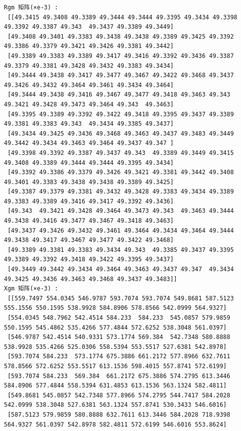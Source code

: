 \documentclass[11pt]{article}
\begin{document}
    \begin{Verbatim}[commandchars=\\\{\}]
Rgm 矩阵(×e-3) : 
 [[49.3415 49.3408 49.3389 49.3444 49.3444 49.3395 49.3434 49.3398 49.3392 49.3387 49.343  49.3437 49.3389 49.3449]
 [49.3408 49.3401 49.3383 49.3438 49.3438 49.3389 49.3425 49.3392 49.3386 49.3379 49.3421 49.3426 49.3381 49.3442]
 [49.3389 49.3383 49.3389 49.3417 49.3416 49.3392 49.3436 49.3387 49.3379 49.3381 49.3428 49.3432 49.3383 49.3434]
 [49.3444 49.3438 49.3417 49.3477 49.3467 49.3422 49.3468 49.3437 49.3426 49.3432 49.3464 49.3461 49.3434 49.3464]
 [49.3444 49.3438 49.3416 49.3467 49.3477 49.3418 49.3463 49.343  49.3421 49.3428 49.3473 49.3464 49.343  49.3463]
 [49.3395 49.3389 49.3392 49.3422 49.3418 49.3395 49.3437 49.3389 49.3381 49.3383 49.343  49.3434 49.3385 49.3437]
 [49.3434 49.3425 49.3436 49.3468 49.3463 49.3437 49.3483 49.3449 49.3442 49.3434 49.3463 49.3464 49.3437 49.347 ]
 [49.3398 49.3392 49.3387 49.3437 49.343  49.3389 49.3449 49.3415 49.3408 49.3389 49.3444 49.3444 49.3395 49.3434]
 [49.3392 49.3386 49.3379 49.3426 49.3421 49.3381 49.3442 49.3408 49.3401 49.3383 49.3438 49.3438 49.3389 49.3425]
 [49.3387 49.3379 49.3381 49.3432 49.3428 49.3383 49.3434 49.3389 49.3383 49.3389 49.3416 49.3417 49.3392 49.3436]
 [49.343  49.3421 49.3428 49.3464 49.3473 49.343  49.3463 49.3444 49.3438 49.3416 49.3477 49.3467 49.3418 49.3463]
 [49.3437 49.3426 49.3432 49.3461 49.3464 49.3434 49.3464 49.3444 49.3438 49.3417 49.3467 49.3477 49.3422 49.3468]
 [49.3389 49.3381 49.3383 49.3434 49.343  49.3385 49.3437 49.3395 49.3389 49.3392 49.3418 49.3422 49.3395 49.3437]
 [49.3449 49.3442 49.3434 49.3464 49.3463 49.3437 49.347  49.3434 49.3425 49.3436 49.3463 49.3468 49.3437 49.3483]]
Xgm 矩阵(×e-3) : 
 [[559.7497 554.0345 546.9787 593.7074 593.7074 549.8681 587.5123 555.1556 550.1595 538.9928 584.8906 578.8566 542.0999 564.9327]
 [554.0345 548.7962 542.4514 584.233  584.233  545.0857 579.9859 550.1595 545.4862 535.4266 577.4844 572.6252 538.3048 561.0397]
 [546.9787 542.4514 540.9331 573.1774 569.384  542.7348 580.8888 538.9928 535.4266 525.0306 558.5394 553.5517 527.6381 542.8978]
 [593.7074 584.233  573.1774 675.3886 661.2172 577.8966 632.7611 578.8566 572.6252 553.5517 613.1536 598.4015 557.8741 572.6199]
 [593.7074 584.233  569.384  661.2172 675.3886 574.2795 613.3446 584.8906 577.4844 558.5394 631.4853 613.1536 563.1324 582.4811]
 [549.8681 545.0857 542.7348 577.8966 574.2795 544.7417 584.2028 542.0999 538.3048 527.6381 563.1324 557.8741 530.3433 546.6016]
 [587.5123 579.9859 580.8888 632.7611 613.3446 584.2028 718.9398 564.9327 561.0397 542.8978 582.4811 572.6199 546.6016 553.8624]

\end{Verbatim}
\end{document}
